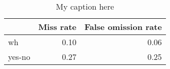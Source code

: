 \begin{table}[!ht]
\centering
\begin{tabular}{lrr}
\toprule
{} &  Miss rate &  False omission rate \\
\midrule
wh     &       0.10 &                 0.06 \\
yes-no &       0.27 &                 0.25 \\
\bottomrule
\end{tabular}
\caption{My caption here}
\label{tab:INTERROGATIVE-ocd-combined-errors}
\end{table}